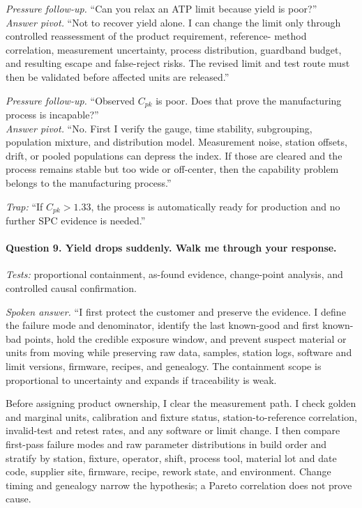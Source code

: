 \textit{Pressure follow-up.} ``Can you relax an ATP limit because yield is
poor?''\\
\textit{Answer pivot.} ``Not to recover yield alone. I can change the limit
only through controlled reassessment of the product requirement, reference-
method correlation, measurement uncertainty, process distribution, guardband
budget, and resulting escape and false-reject risks. The revised limit and test
route must then be validated before affected units are released.''

\textit{Pressure follow-up.} ``Observed $C_{pk}$ is poor. Does that prove the
manufacturing process is incapable?''\\
\textit{Answer pivot.} ``No. First I verify the gauge, time stability,
subgrouping, population mixture, and distribution model. Measurement noise,
station offsets, drift, or pooled populations can depress the index. If those
are cleared and the process remains stable but too wide or off-center, then the
capability problem belongs to the manufacturing process.''

\textit{Trap:} ``If $C_{pk}>1.33$, the process is automatically ready for
production and no further SPC evidence is needed.''

\paragraph{Question 9. Yield drops suddenly. Walk me through your response.}
\textit{Tests:} proportional containment, as-found evidence, change-point
analysis, and controlled causal confirmation.

\textit{Spoken answer.}
``I first protect the customer and preserve the evidence. I define the failure
mode and denominator, identify the last known-good and first known-bad points,
hold the credible exposure window, and prevent suspect material or units from
moving while preserving raw data, samples, station logs, software and limit
versions, firmware, recipes, and genealogy. The containment scope is
proportional to uncertainty and expands if traceability is weak.

Before assigning product ownership, I clear the measurement path. I check
golden and marginal units, calibration and fixture status, station-to-reference
correlation, invalid-test and retest rates, and any software or limit change. I
then compare first-pass failure modes and raw parameter distributions in build
order and stratify by station, fixture, operator, shift, process tool, material
lot and date code, supplier site, firmware, recipe, rework state, and
environment. Change timing and genealogy narrow the hypothesis; a Pareto
correlation does not prove cause.

